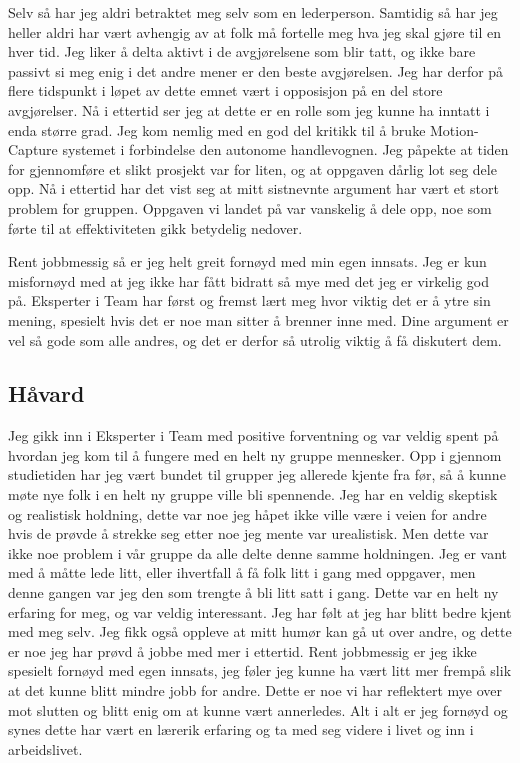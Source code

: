 Selv så har jeg aldri betraktet meg selv som en lederperson. Samtidig så har jeg heller aldri har vært avhengig av at folk må fortelle meg hva jeg skal gjøre til en hver tid. Jeg liker å delta aktivt i de avgjørelsene som blir tatt, og ikke bare passivt si meg enig i det andre mener er den beste avgjørelsen. Jeg har derfor på flere tidspunkt i løpet av dette emnet vært i opposisjon på en del store avgjørelser. Nå i ettertid ser jeg at dette er en rolle som jeg kunne ha inntatt i enda større grad. Jeg kom nemlig med en god del kritikk til å bruke Motion-Capture systemet i forbindelse den autonome handlevognen. Jeg påpekte at tiden for gjennomføre et slikt prosjekt var for liten, og at oppgaven dårlig lot seg dele opp. Nå i ettertid har det vist seg at mitt sistnevnte argument har vært et stort problem for gruppen. Oppgaven vi landet på var vanskelig å dele opp, noe som førte til at effektiviteten gikk betydelig nedover. 

Rent jobbmessig så er jeg helt greit fornøyd med min egen innsats. Jeg er kun misfornøyd med at jeg ikke har fått bidratt så mye med det jeg er virkelig god på. Eksperter i Team har først og fremst lært meg hvor viktig det er å ytre sin mening, spesielt hvis det er noe man sitter å brenner inne med. Dine argument er vel så gode som alle andres, og det er derfor så utrolig viktig å få diskutert dem. 

\subsection{Håvard}
Jeg gikk inn i Eksperter i Team med positive forventning og var veldig spent på hvordan jeg kom til å fungere med en helt ny gruppe mennesker. Opp i gjennom studietiden har jeg vært bundet til grupper jeg allerede kjente fra før, så å kunne møte nye folk i en helt ny gruppe ville bli spennende. Jeg har en veldig skeptisk og realistisk holdning, dette var noe jeg håpet ikke ville være i veien for andre hvis de prøvde å strekke seg etter noe jeg mente var urealistisk. Men dette var ikke noe problem i vår gruppe da alle delte denne samme holdningen. Jeg er vant med å måtte lede litt, eller ihvertfall å få folk litt i gang med oppgaver, men denne gangen var jeg den som trengte å bli litt satt i gang. Dette var en helt ny erfaring for meg, og var veldig interessant. Jeg har følt at jeg har blitt bedre kjent med meg selv. Jeg fikk også oppleve at mitt humør kan gå ut over andre, og dette er noe jeg har prøvd å jobbe med mer i ettertid. Rent jobbmessig er jeg ikke spesielt fornøyd med egen innsats, jeg føler jeg kunne ha vært litt mer frempå slik at det kunne blitt mindre jobb for andre. Dette er noe vi har reflektert mye over mot slutten og blitt enig om at kunne vært annerledes. Alt i alt er jeg fornøyd og synes dette har vært en lærerik erfaring og ta med seg videre i livet og inn i arbeidslivet.

